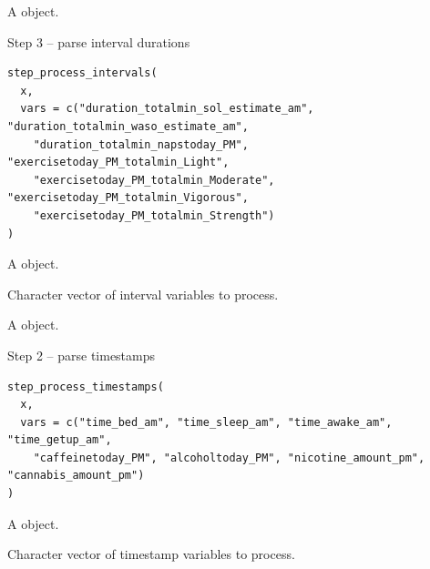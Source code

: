 \documentclass[a4paper]{book}
\begin{document}
%
\begin{Value}
A  object.
\end{Value}
%
\begin{Description}
Step 3 -- parse interval durations
\end{Description}
%
\begin{Usage}
\begin{verbatim}
step_process_intervals(
  x,
  vars = c("duration_totalmin_sol_estimate_am", "duration_totalmin_waso_estimate_am",
    "duration_totalmin_napstoday_PM", "exercisetoday_PM_totalmin_Light",
    "exercisetoday_PM_totalmin_Moderate", "exercisetoday_PM_totalmin_Vigorous",
    "exercisetoday_PM_totalmin_Strength")
)
\end{verbatim}
\end{Usage}
%
\begin{Arguments}
\begin{ldescription}
\item[\code{x}] A  object.

\item[\code{vars}] Character vector of interval variables to process.
\end{ldescription}
\end{Arguments}
%
\begin{Value}
A  object.
\end{Value}
%
\begin{Description}
Step 2 -- parse timestamps
\end{Description}
%
\begin{Usage}
\begin{verbatim}
step_process_timestamps(
  x,
  vars = c("time_bed_am", "time_sleep_am", "time_awake_am", "time_getup_am",
    "caffeinetoday_PM", "alcoholtoday_PM", "nicotine_amount_pm", "cannabis_amount_pm")
)
\end{verbatim}
\end{Usage}
%
\begin{Arguments}
\begin{ldescription}
\item[\code{x}] A  object.

\item[\code{vars}] Character vector of timestamp variables to process.
\end{ldescription}
\end{Arguments}
\end{document}
